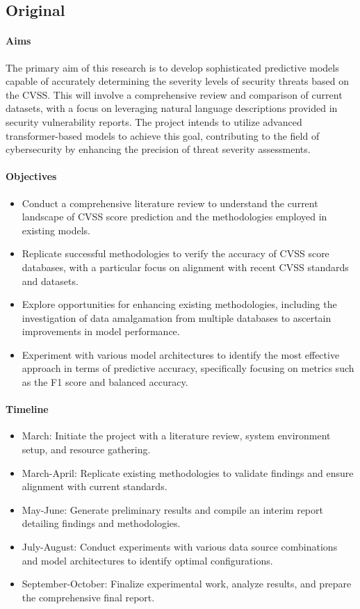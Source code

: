 \documentclass[12pt]{article}
\begin{document}
\subsection*{Original}

\paragraph{Aims}
The primary aim of this research is to develop sophisticated predictive models capable of accurately determining
the severity levels of security threats based on the CVSS. This will involve a comprehensive review and comparison
of current datasets, with a focus on leveraging natural language descriptions provided in security vulnerability reports.
The project intends to utilize advanced transformer-based models to achieve this goal, contributing to the field of
cybersecurity by enhancing the precision of threat severity assessments.

\paragraph{Objectives}
\begin{itemize}[noitemsep]
	\item Conduct a comprehensive literature review to understand the current landscape of CVSS score prediction and the methodologies employed in existing models.
	\item Replicate successful methodologies to verify the accuracy of CVSS score databases, with a particular focus on alignment with recent CVSS standards and datasets.
	\item Explore opportunities for enhancing existing methodologies, including the investigation of data amalgamation from multiple databases to ascertain improvements in model performance.
	\item Experiment with various model architectures to identify the most effective approach in terms of predictive accuracy, specifically focusing on metrics such as the F1 score and balanced accuracy.
\end{itemize}

\paragraph{Timeline}
\begin{itemize}[noitemsep]
	\item March: Initiate the project with a literature review, system environment setup, and resource gathering.
	\item March-April: Replicate existing methodologies to validate findings and ensure alignment with current standards.
	\item May-June: Generate preliminary results and compile an interim report detailing findings and methodologies.
	\item July-August: Conduct experiments with various data source combinations and model architectures to identify optimal configurations.
	\item September-October: Finalize experimental work, analyze results, and prepare the comprehensive final report.
\end{itemize}
\end{document}
